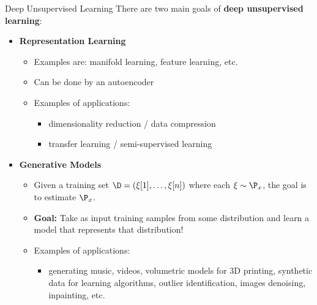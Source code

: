 \begin{frame} {Deep Unsupervised Learning}
There are two main goals of \textbf{deep unsupervised learning}:
    \begin{itemize}
\item \textbf{Representation Learning}
\begin{itemize}
\item Examples are: manifold learning, feature learning, etc.
\item Can be done by an autoencoder
\item Examples of applications:
    \begin{itemize}
\item dimensionality reduction / data compression
\item transfer learning / semi-supervised learning
\end{itemize}
\end{itemize}
\item \textbf{Generative Models }
\begin{itemize}
\item Given a training set $\D = (\xi[1], \ldots, \xi[n])$ where each $\xi \sim \P_x$, the goal is to estimate $\P_x$.
\item \textbf{Goal:} Take as input training samples from some distribution and learn a model that represents that distribution!
\item Examples of applications:
    \begin{itemize}
\item generating music, videos, volumetric models for 3D printing, synthetic data for learning algorithms, outlier identification, images denoising, inpainting, etc.
\end{itemize}
\end{itemize}
\end{itemize}
\end{frame}


